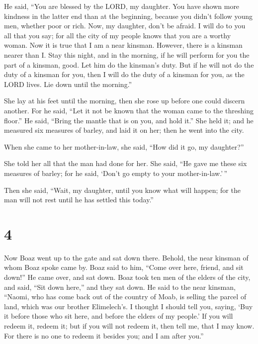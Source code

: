  He said, ``You are blessed by the LORD, my daughter. You
have shown more kindness in the latter end than at the beginning,
because you didn't follow young men, whether poor or rich. 
Now, my daughter, don't be afraid. I will do to you all that you say;
for all the city of my people knows that you are a worthy woman.
 Now it is true that I am a near kinsman. However, there is
a kinsman nearer than I.  Stay this night, and in the
morning, if he will perform for you the part of a kinsman, good. Let him
do the kinsman's duty. But if he will not do the duty of a kinsman for
you, then I will do the duty of a kinsman for you, as the LORD lives.
Lie down until the morning.''

 She lay at his feet until the morning, then she rose up
before one could discern another. For he said, ``Let it not be known
that the woman came to the threshing floor.''  He said,
``Bring the mantle that is on you, and hold it.'' She held it; and he
measured six measures of barley, and laid it on her; then he went into
the city.

 When she came to her mother-in-law, she said, ``How did it
go, my daughter?''

She told her all that the man had done for her.  She said,
``He gave me these six measures of barley; for he said, `Don't go empty
to your mother-in-law.'\,''

 Then she said, ``Wait, my daughter, until you know what
will happen; for the man will not rest until he has settled this
today.''

\hypertarget{section-3}{%
\section{4}\label{section-3}}

 Now Boaz went up to the gate and sat down there. Behold,
the near kinsman of whom Boaz spoke came by. Boaz said to him, ``Come
over here, friend, and sit down!'' He came over, and sat down.
 Boaz took ten men of the elders of the city, and said,
``Sit down here,'' and they sat down.  He said to the near
kinsman, ``Naomi, who has come back out of the country of Moab, is
selling the parcel of land, which was our brother Elimelech's.
 I thought I should tell you, saying, `Buy it before those
who sit here, and before the elders of my people.' If you will redeem
it, redeem it; but if you will not redeem it, then tell me, that I may
know. For there is no one to redeem it besides you; and I am after
you.''

